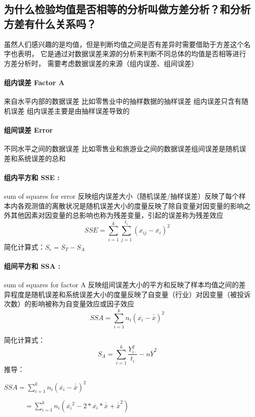 \documentclass[UTF8,10pt]{book}
\begin{document}
\subsection{为什么检验均值是否相等的分析叫做方差分析？和分析方差有什么关系吗？}
    虽然人们感兴趣的是均值，但是判断均值之间是否有差异时需要借助于方差这个名字也表明，
    它是通过对数据误差来源的分析来判断不同总体的均值是否相等进行方差分析时，
    需要考虑数据误差的来源（组内误差、组间误差）

    \paragraph{组内误差 Factor A}	来自水平内部的数据误差 比如零售业中的抽样数据的抽样误差 组内误差只含有随机误差 组内误差主要是由抽样误差导致的

    \paragraph{组间误差 Error}	不同水平之间的数据误差 比如零售业和旅游业之间的数据误差组间误差是随机误差和系统误差的总和

    \paragraph{组内平方和 SSE :} sum of squares for error	反映组内误差大小（随机误差/抽样误差）反映了每个样本内各观测值的离散状况是随机误差大小的度量反映了除自变量对因变量的影响之外其他因素对因变量的总影响也称为残差变量，引起的误差称为残差效应$$ SSE = \sum_{i=1}^k \sum_{j=1}^{t_i} (x_{ij}-\overline{x_i})^2 $$ 简化计算式：$ S_e = S_T - S_A $

    \paragraph{组间平方和 SSA :} sum of squares for factor A	反映组间误差大小的平方和反映了样本均值之间的差异程度是随机误差和系统误差大小的度量反映了自变量（行业）对因变量（被投诉次数）的影响被称为自变量效应或因子效应$$ SSA = \sum_{i=1}^k n_i \left(\overline{x_i} - \overline{\overline{x}} \right)^2 $$ 
    
    简化计算式：
    $$ S_A = \sum_{i=1}^k \frac{Y_{i \cdot}^2}{t_i} -n\overline{Y}^2 $$ 
    推导： 
    
    $ SSA = \sum_{i=1}^k n_i \left(\overline{x_i} - \overline{\overline{x}} \right)^2 $ 
    
    $\quad \quad \quad = \sum_{i=1}^k n_i \left( \overline{x_i}^2 -2*\overline{x_i} * \overline{\overline{x}} + \overline{\overline{x}}^2 \right) $ 
    
\end{document}
